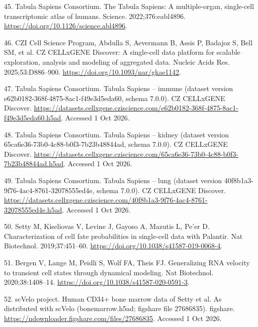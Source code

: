 \documentclass[
  11pt,
]{article}
\newlength{\cslhangindent}
\newenvironment{CSLReferences}[2] %
 {\begin{list}{}{%
  \setlength{\itemindent}{0pt}
  \setlength{\leftmargin}{0pt}
  \setlength{\parsep}{0pt}
  \ifodd #1
   \setlength{\leftmargin}{\cslhangindent}
   \setlength{\itemindent}{-1\cslhangindent}
  \fi
  \setlength{\itemsep}{#2\baselineskip}}}
 {\end{list}}
\begin{document}
\begin{CSLReferences}{0}{1}
45. Tabula Sapiens Consortium. The {Tabula Sapiens}: A multiple-organ,
single-cell transcriptomic atlas of humans. Science. 2022;376:eabl4896.
\url{https://doi.org/10.1126/science.abl4896}.

46. {CZI Cell Science Program, Abdulla S, Aevermann B, Assis P, Badajoz
S, Bell SM, et al.} {CZ CELLxGENE Discover}: A single-cell data platform
for scalable exploration, analysis and modeling of aggregated data.
Nucleic Acids Res. 2025;53:D886--900.
\url{https://doi.org/10.1093/nar/gkae1142}.

47. Tabula Sapiens Consortium. Tabula {Sapiens} -- immune (dataset
version e62b0182-368f-4875-8ac1-f49e3d5eda60, schema 7.0.0). CZ
CELLxGENE Discover.
\url{https://datasets.cellxgene.cziscience.com/e62b0182-368f-4875-8ac1-f49e3d5eda60.h5ad}.
Accessed 1 Oct 2026.

48. Tabula Sapiens Consortium. Tabula {Sapiens} -- kidney (dataset
version 65ca6e36-73b0-4c88-b0f3-7b23b48844ad, schema 7.0.0). CZ
CELLxGENE Discover.
\url{https://datasets.cellxgene.cziscience.com/65ca6e36-73b0-4c88-b0f3-7b23b48844ad.h5ad}.
Accessed 1 Oct 2026.

49. Tabula Sapiens Consortium. Tabula {Sapiens} -- lung (dataset version
40f8b1a3-9f76-4ac4-8761-32078555ed4e, schema 7.0.0). CZ CELLxGENE
Discover.
\url{https://datasets.cellxgene.cziscience.com/40f8b1a3-9f76-4ac4-8761-32078555ed4e.h5ad}.
Accessed 1 Oct 2026.

50. Setty M, Kiseliovas V, Levine J, Gayoso A, Mazutis L, Pe'er D.
Characterization of cell fate probabilities in single-cell data with
{Palantir}. Nat Biotechnol. 2019;37:451--60.
\url{https://doi.org/10.1038/s41587-019-0068-4}.

51. Bergen V, Lange M, Peidli S, Wolf FA, Theis FJ. Generalizing {RNA}
velocity to transient cell states through dynamical modeling. Nat
Biotechnol. 2020;38:1408--14.
\url{https://doi.org/10.1038/s41587-020-0591-3}.

52. {scVelo project}. Human {CD34+} bone marrow data of {Setty} et al.
As distributed with {scVelo} (bonemarrow.h5ad; figshare file 27686835).
figshare. \url{https://ndownloader.figshare.com/files/27686835}.
Accessed 1 Oct 2026.


\end{CSLReferences}
\end{document}
